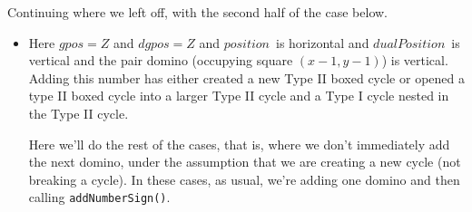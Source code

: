 \documentclass[12pt]{article}
\numberwithin{equation}{section}
\newcommand{\pos}{$position$}
\newcommand{\dpos}{$dualPosition$}
\begin{document}
  Continuing where we left off, with the second half of the case below.
  \begin{itemize}
    \item Here $gpos = Z$ and $dgpos = Z$ and \pos\ is horizontal and \linebreak\dpos\ is vertical and the pair domino (occupying square \linebreak$(x - 1, y - 1)$) is vertical.
    Adding this number has either created a new Type II boxed cycle or opened a type II boxed cycle into a larger Type II cycle and a Type I cycle nested in the Type II cycle.

    Here we'll do the rest of the cases, that is, where we don't immediately add the next domino, under the assumption that we are creating a new cycle (not breaking a cycle).
    In these cases, as usual, we're adding one domino and then calling \texttt{addNumberSign()}.


\end{itemize}
\end{document}
